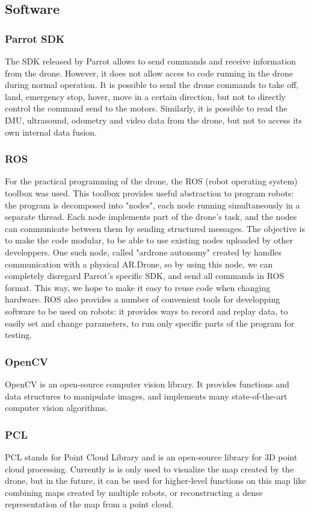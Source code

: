 \subsection{Software}

\subsubsection{Parrot SDK}
The SDK released by Parrot allows to send commands and receive information from the drone. However, it does not allow acces to code running in the drone during normal operation. It is possible to send the drone commands to take off, land, emergency stop, hover, move in a certain direction, but not to directly control the command send to the motors. Similarly, it is possible to read the IMU, ultrasound, odometry and video data from the drone, but not to access its own internal data fusion.

\subsubsection{ROS}
For the practical programming of the drone, the ROS (robot operating system) toolbox was used. This toolbox provides useful abstraction to program robots: the program is decomposed into "nodes", each node running simultaneously in a separate thread. Each node implements part of the drone's task, and the nodes can communicate between them by sending structured messages. The objective is to make the code modular, to be able to use existing nodes uploaded by other developpers. One such node, called "ardrone autonomy" created by %
handles communication with a physical AR.Drone, so by using this node, we can completely disregard Parrot's specific SDK, and send all commands in ROS format. This way, we hope to make it easy to reuse code when changing hardware. ROS also provides a number of convenient tools for developping software to be used on robots: it provides ways to record and replay data, to easily set and change parameters, to run only specific parts of the program for testing.

\subsubsection{OpenCV}
OpenCV is an open-source computer vision library. It provides functions and data structures to manipulate images, and implements many state-of-the-art computer vision algorithms.

\subsubsection{PCL}
PCL stands for Point Cloud Library and is an open-source library for 3D point cloud processing. Currently is is only used to visualize the map created by the drone, but in the future, it can be used for higher-level functions on this map like combining maps created by multiple robots, or reconstructing a dense representation of the map from a point cloud.

